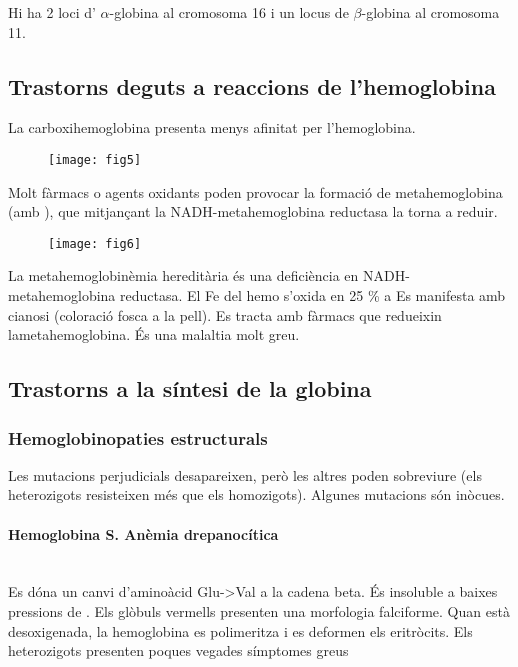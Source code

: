\begin{itemize}
Hi ha 2 loci d' $\alpha$-globina al cromosoma 16 i un locus de $\beta$-globina
al cromosoma 11.

\subsection{Trastorns deguts a reaccions de l'hemoglobina}
La carboxihemoglobina presenta menys afinitat per l'hemoglobina.

\begin{figure}[H]
  \centering
  \texttt{[image: fig5]}
\end{figure}

Molt fàrmacs o agents oxidants poden provocar la formació de
metahemoglobina (amb ), que mitjançant la NADH-metahemoglobina
reductasa la torna a reduir.

\begin{figure}[H]
  \centering
  \texttt{[image: fig6]}
\end{figure}

La metahemoglobinèmia hereditària és una deficiència en NADH-metahemoglobina
reductasa. El Fe del hemo s'oxida en 25 \% a  Es manifesta amb
cianosi (coloració fosca a la pell). Es tracta amb fàrmacs que
redueixin lametahemoglobina. És una malaltia
molt greu.

\subsection{Trastorns a la síntesi de la globina}
\subsubsection{Hemoglobinopaties estructurals}
Les mutacions perjudicials desapareixen, però les altres poden sobreviure
(els heterozigots resisteixen més que els homozigots). Algunes
mutacions són inòcues.

\paragraph{Hemoglobina S. Anèmia drepanocítica} \hfill \\
Es dóna un canvi d'aminoàcid Glu->Val a la cadena beta. És insoluble a baixes pressions
de . Els glòbuls vermells presenten una morfologia
falciforme. Quan està desoxigenada, la hemoglobina es polimeritza i es
deformen els eritròcits. Els heterozigots  presenten poques vegades símptomes greus


\end{itemize}
